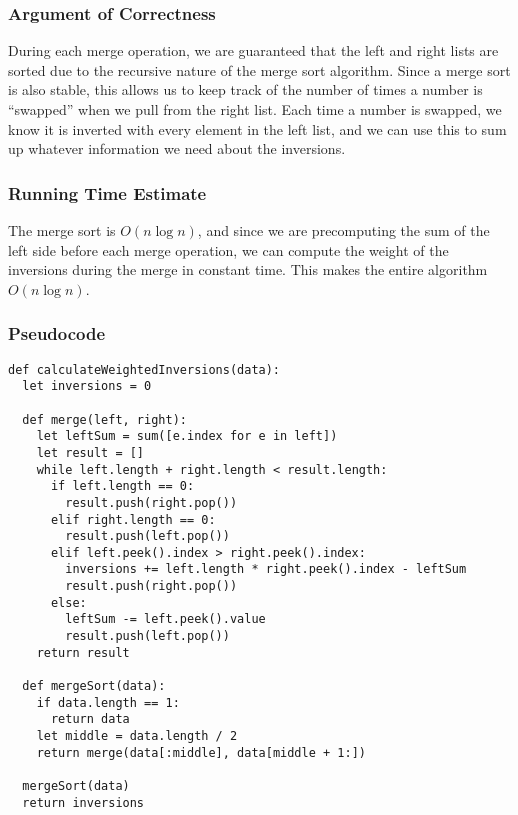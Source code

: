 \documentclass[letterpaper, 12pt]{math}
\begin{document}
\subsubsection*{Argument of Correctness}
During each merge operation, we are guaranteed that the left and right lists
are sorted due to the recursive nature of the merge sort algorithm. Since a
merge sort is also stable, this allows us to keep track of the number of times
a number is ``swapped'' when we pull from the right list. Each time a number
is swapped, we know it is inverted with every element in the left list, and
we can use this to sum up whatever information we need about the inversions.

\subsubsection*{Running Time Estimate}
The merge sort is \( O(n\log n) \), and since we are precomputing the
sum of the left side before each merge operation, we can compute the weight
of the inversions during the merge in constant time. This makes the entire
algorithm \( O(n\log n) \).

\subsubsection*{Pseudocode}
\begin{lstlisting}
def calculateWeightedInversions(data):
  let inversions = 0

  def merge(left, right):
    let leftSum = sum([e.index for e in left])
    let result = []
    while left.length + right.length < result.length:
      if left.length == 0:
        result.push(right.pop())
      elif right.length == 0:
        result.push(left.pop())
      elif left.peek().index > right.peek().index:
        inversions += left.length * right.peek().index - leftSum
        result.push(right.pop())
      else:
        leftSum -= left.peek().value
        result.push(left.pop())
    return result

  def mergeSort(data):
    if data.length == 1:
      return data
    let middle = data.length / 2
    return merge(data[:middle], data[middle + 1:])

  mergeSort(data)
  return inversions
\end{lstlisting}
\end{document}
